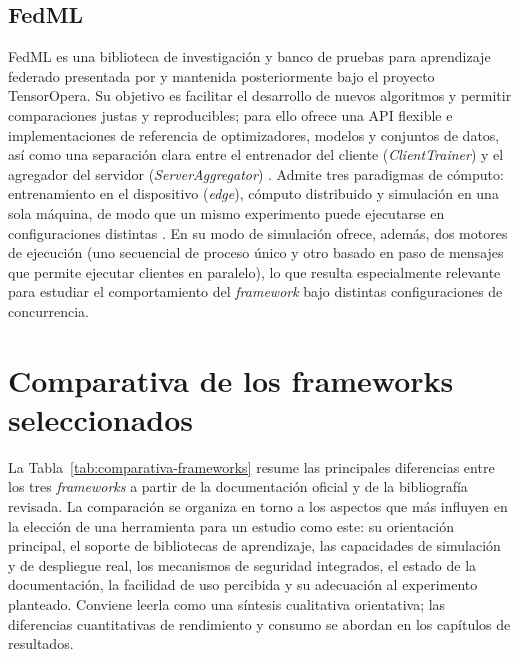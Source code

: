 \subsection{FedML}\label{sec:ea-fedml}

FedML es una biblioteca de investigación y banco de pruebas para aprendizaje federado
presentada por \textcite{he2020fedml} y mantenida posteriormente bajo el proyecto
TensorOpera. Su objetivo es facilitar el desarrollo de nuevos algoritmos y permitir
comparaciones justas y reproducibles; para ello ofrece una API flexible e implementaciones
de referencia de optimizadores, modelos y conjuntos de datos, así como una separación
clara entre el entrenador del cliente (\textit{ClientTrainer}) y el agregador del servidor
(\textit{ServerAggregator}) \parencite{he2020fedml}. Admite tres paradigmas de cómputo:
entrenamiento en el dispositivo (\textit{edge}), cómputo distribuido y simulación en una
sola máquina, de modo que un mismo experimento puede ejecutarse en configuraciones
distintas \parencite{he2020fedml}. En su modo de simulación ofrece, además, dos motores de
ejecución (uno secuencial de proceso único y otro basado en paso de mensajes que permite
ejecutar clientes en paralelo), lo que resulta especialmente relevante para estudiar el
comportamiento del \textit{framework} bajo distintas configuraciones de concurrencia.

\section{Comparativa de los frameworks seleccionados}\label{sec:ea-comparativa-frameworks}

La Tabla~\ref{tab:comparativa-frameworks} resume las principales diferencias entre los
tres \textit{frameworks} a partir de la documentación oficial y de la bibliografía
revisada. La comparación se organiza en torno a los aspectos que más influyen en la
elección de una herramienta para un estudio como este: su orientación principal, el
soporte de bibliotecas de aprendizaje, las capacidades de simulación y de despliegue real,
los mecanismos de seguridad integrados, el estado de la documentación, la facilidad de uso
percibida y su adecuación al experimento planteado. Conviene leerla como una síntesis
cualitativa orientativa; las diferencias cuantitativas de rendimiento y consumo se abordan
en los capítulos de resultados.


